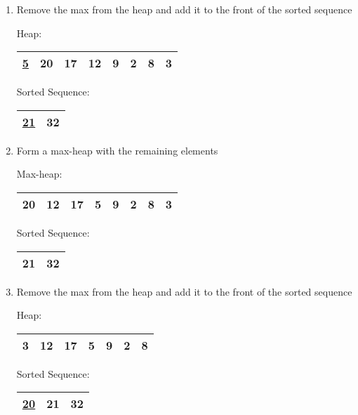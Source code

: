 \documentclass[fleqn, 12pt]{article}
\begin{document}
\begin{enumerate}[Step 1:]
\item Remove the max from the heap and add it to the front of the sorted sequence
    \begin{center}
        Heap:
        \begin{tabular}{|*{8}{c|}}
            \hline
            \underline{5} & 20 & 17 & 12 & 9 & 2 & 8 & 3\\
            \hline
        \end{tabular}
    \end{center}
    \begin{center}
        Sorted Sequence:
        \begin{tabular}{|*{2}{c|}}
            \hline
            \underline{21} & 32\\
            \hline
        \end{tabular}
    \end{center}
    
\item Form a max-heap with the remaining elements
    \begin{center}
        Max-heap:
        \begin{tabular}{|*{8}{c|}}
            \hline
            20 & 12 & 17 & 5 & 9 & 2 & 8 & 3\\
            \hline
        \end{tabular}
    \end{center}
    \begin{center}
        Sorted Sequence:
        \begin{tabular}{|*{2}{c|}}
            \hline
            21 & 32\\
            \hline
        \end{tabular}
    \end{center}
    
\item Remove the max from the heap and add it to the front of the sorted sequence
    \begin{center}
        Heap:
        \begin{tabular}{|*{7}{c|}}
            \hline
            3 & 12 & 17 & 5 & 9 & 2 & 8\\
            \hline
        \end{tabular}
    \end{center}
    \begin{center}
        Sorted Sequence:
        \begin{tabular}{|*{3}{c|}}
            \hline
            \underline{20} & 21 & 32\\
            \hline
        \end{tabular}
    \end{center}
    

\end{enumerate}
\end{document}
